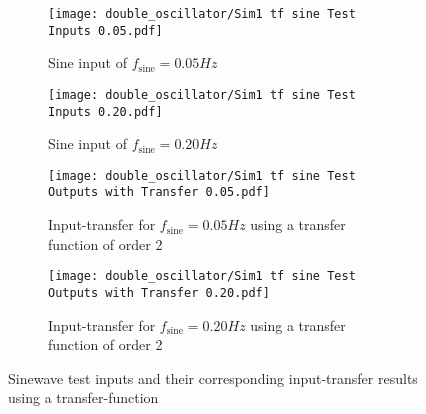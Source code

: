 \begin{figure}
    \centering
    \begin{subfigure}[t]{0.495\textwidth}
        \centering
        \texttt{[image: double\_oscillator/Sim1 tf sine Test Inputs 0.05.pdf]}
        \caption{Sine input of $f_{\mathrm{sine}}=0.05\unit{Hz}$}
    \end{subfigure}
    \hfill
    \begin{subfigure}[t]{0.495\textwidth}
        \centering
        \texttt{[image: double\_oscillator/Sim1 tf sine Test Inputs 0.20.pdf]}
         \caption{Sine input of $f_{\mathrm{sine}}=0.20\unit{Hz}$}
    \end{subfigure}
	\begin{subfigure}[t]{0.495\textwidth}
        \centering
        \texttt{[image: double\_oscillator/Sim1 tf sine Test Outputs with Transfer 0.05.pdf]}
        \caption{Input-transfer for $f_{\mathrm{sine}}=0.05\unit{Hz}$ using a transfer function of order 2}
    \end{subfigure}
    \hfill
    \begin{subfigure}[t]{0.495\textwidth}
        \centering
        \texttt{[image: double\_oscillator/Sim1 tf sine Test Outputs with Transfer 0.20.pdf]}
         \caption{Input-transfer for $f_{\mathrm{sine}}=0.20\unit{Hz}$ using a transfer function of order 2}
    \end{subfigure}    
    \caption[Double Oscillator -- Input Trajectories and Output Error Trajectories (Sinusoidal Input)]{Sinewave test inputs and their corresponding input-transfer results using a transfer-function}
    \label{fig:sim1_sine}
\end{figure}



